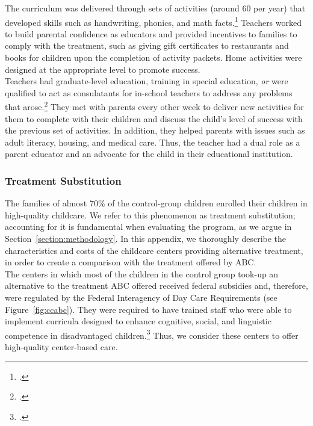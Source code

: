 \begin{appendices}
\noindent The curriculum was delivered through sets of activities (around 60 per year) that developed skills such as handwriting, phonics, and math facts.\footnote{\cite{Campbell-Ramey_1989_Preschool-vs-School-age}.} Teachers worked to build parental confidence as educators and provided incentives to families to comply with the treatment, such as giving gift certificates to restaurants and books for children upon the completion of activity packets. Home activities were designed at the appropriate level to promote success.\\

\noindent Teachers had graduate-level education, training in special education, \textit{or} were qualified to act as consulatants for in-school teachers to address any problems that arose.\footnote{\cite{Ramey_Campbell_1991_childreninpoverty}.} They met with parents every other week to deliver new activities for them to complete with their children and discuss the child's level of success with the previous set of activities. In addition, they helped parents with issues such as adult literacy, housing, and medical care. Thus, the teacher had a dual role as a parent educator and an advocate for the child in their educational institution.

\subsubsection{Treatment Substitution}

\noindent The families of almost $70\%$ of the control-group children enrolled their children in high-quality childcare. We refer to this phenomenon as treatment substitution; accounting for it is fundamental when evaluating the program, as we argue in Section~\ref{section:methodology}. In this appendix, we thoroughly describe the characteristics and costs of the childcare centers providing alternative treatment, in order to create a comparison with the treatment offered by ABC.\\

\noindent The centers in which most of the children in the control group took-up an alternative to the treatment ABC offered received federal subsidies and, therefore, were regulated by the Federal Interagency of Day Care Requirements (see Figure~\ref{fig:ccabc}). They were required to have trained staff who were able to implement curricula designed to enhance cognitive, social, and linguistic competence in disadvantaged children.\footnote{\citet{Burchinal_etal_1989_CD_Daycare-Pre-K-Dev}.} Thus, we consider these centers to offer high-quality center-based care.


\end{appendices}
